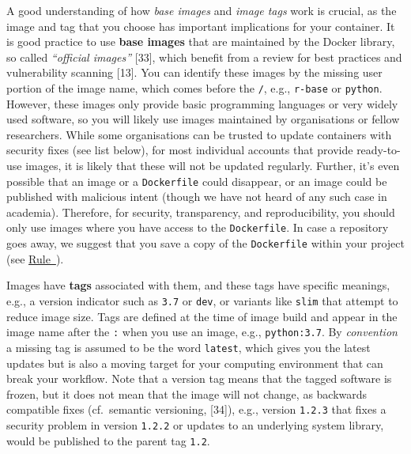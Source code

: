 \documentclass[10pt,letterpaper]{article}
\begin{document}
  \label{rule:base} 

A good understanding of how \emph{base images} and \emph{image tags}
work is crucial, as the image and tag that you choose has important
implications for your container. It is good practice to use \textbf{base
images} that are maintained by the Docker library, so called
\emph{``official images''} {[}33{]}, which benefit from a review for
best practices and vulnerability scanning {[}13{]}. You can identify
these images by the missing user portion of the image name, which comes
before the \texttt{/}, e.g., \texttt{r-base} or \texttt{python}.
However, these images only provide basic programming languages or very
widely used software, so you will likely use images maintained by
organisations or fellow researchers. While some organisations can be
trusted to update containers with security fixes (see list below), for
most individual accounts that provide ready-to-use images, it is likely
that these will not be updated regularly. Further, it's even possible
that an image or a \texttt{Dockerfile} could disappear, or an image
could be published with malicious intent (though we have not heard of
any such case in academia). Therefore, for security, transparency, and
reproducibility, you should only use images where you have access to the
\texttt{Dockerfile}. In case a repository goes away, we suggest that you
save a copy of the \texttt{Dockerfile} within your project (see
\hyperref[{rule:mount}]{Rule~}).

Images have \textbf{tags} associated with them, and these tags have
specific meanings, e.g., a version indicator such as \texttt{3.7} or
\texttt{dev}, or variants like \texttt{slim} that attempt to reduce
image size. Tags are defined at the time of image build and appear in
the image name after the \texttt{:} when you use an image, e.g.,
\texttt{python:3.7}. By \emph{convention} a missing tag is assumed to be
the word \texttt{latest}, which gives you the latest updates but is also
a moving target for your computing environment that can break your
workflow. Note that a version tag means that the tagged software is
frozen, but it does not mean that the image will not change, as
backwards compatible fixes (cf.~semantic versioning, {[}34{]}), e.g.,
version \texttt{1.2.3} that fixes a security problem in version
\texttt{1.2.2} or updates to an underlying system library, would be
published to the parent tag \texttt{1.2}.
\end{document}
